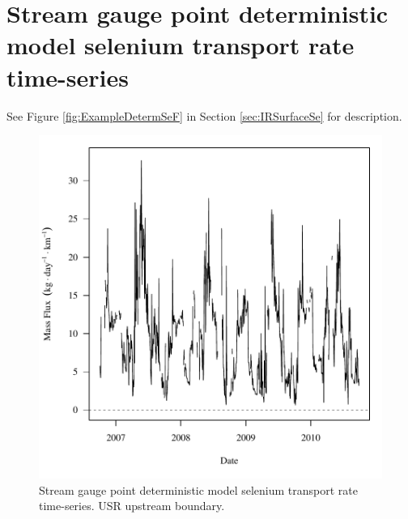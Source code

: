 \section{Stream gauge point deterministic model selenium transport rate time-series}
\label{App:SeF-D}

See Figure \ref{fig:ExampleDetermSeF} in Section \ref{sec:IRSurfaceSe} for description.

\begin{figure}[htbp]
	\begin{center}
	\includegraphics[width=6in]{"Figures/Results_DUSR/f U163"}
	\caption{Stream gauge point deterministic model selenium transport rate time-series.  USR upstream boundary.}
	\end{center}
\end{figure}
\newpage

